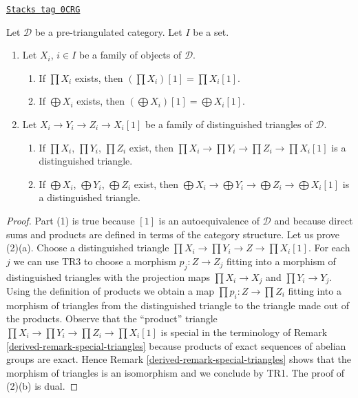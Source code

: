 \begin{lemma}
\label{derived-lemma-products-sums-shifts-triangles}
\href{https://stacks.math.columbia.edu/tag/0CRG}{\texttt{Stacks tag 0CRG}}

Let $\mathcal{D}$ be a pre-triangulated category.
Let $I$ be a set.
\begin{enumerate}
\item Let $X_i$, $i \in I$ be a family of objects of $\mathcal{D}$.
\begin{enumerate}
\item If $\prod X_i$ exists, then $(\prod X_i)[1] = \prod X_i[1]$.
\item If $\bigoplus X_i$ exists, then $(\bigoplus X_i)[1] = \bigoplus X_i[1]$.
\end{enumerate}
\item Let $X_i \to Y_i \to Z_i \to X_i[1]$ be a family of distinguished
triangles of $\mathcal{D}$.
\begin{enumerate}
\item If $\prod X_i$, $\prod Y_i$, $\prod Z_i$ exist, then
$\prod X_i \to \prod Y_i \to \prod Z_i \to \prod X_i[1]$
is a distinguished triangle.
\item If $\bigoplus X_i$, $\bigoplus Y_i$,
$\bigoplus Z_i$ exist, then
$\bigoplus X_i \to \bigoplus Y_i \to \bigoplus Z_i \to \bigoplus X_i[1]$
is a distinguished triangle.
\end{enumerate}
\end{enumerate}
\end{lemma}

\begin{proof}

Part (1) is true because $[1]$ is an autoequivalence of $\mathcal{D}$
and because direct sums and products are defined in terms of the
category structure. Let us prove (2)(a). Choose a distinguished triangle
$\prod X_i \to \prod Y_i \to Z \to \prod X_i[1]$. For each $j$ we can
use TR3 to choose a morphism $p_j : Z \to Z_j$
fitting into a morphism of distinguished
triangles with the projection maps $\prod X_i \to X_j$ and $\prod Y_i \to Y_j$.
Using the definition of products we obtain a map
$\prod p_i : Z \to \prod Z_i$ fitting into a morphism
of triangles from the distinguished triangle to the triangle
made out of the products. Observe that the ``product'' triangle
$\prod X_i \to \prod Y_i \to \prod Z_i \to \prod X_i[1]$
is special in the terminology of Remark \ref{derived-remark-special-triangles}
because products of exact sequences of abelian groups are exact.
Hence Remark \ref{derived-remark-special-triangles} shows that
the morphism of triangles is an isomorphism and we conclude by TR1.
The proof of (2)(b) is dual.
\end{proof}


